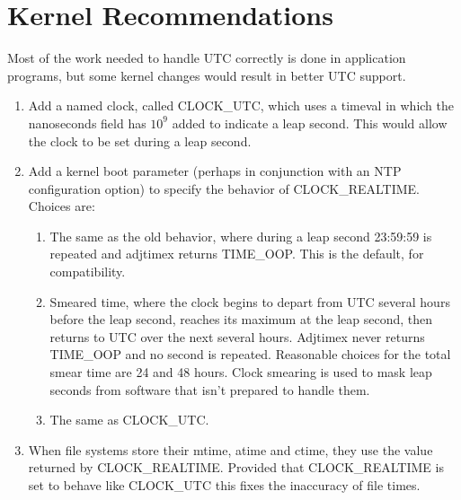 \documentclass[letterpaper,twoside]{article}
\begin{document}
\section{Kernel Recommendations}
\label{section:KernelRecommendations}
Most of the work needed to handle UTC correctly is done in application
programs, but some kernel changes would result in better UTC support.
\begin{enumerate}
\item Add a named clock, called {\ttfamily CLOCK\_UTC}, which uses
  a {\ttfamily timeval} in which the nanoseconds field has $10^{9}$ added to
  indicate a leap second.  This would allow the clock to be set
  during a leap second.
\item Add a kernel boot parameter (perhaps in conjunction with
  an NTP configuration option) to specify the behavior of
  {\ttfamily CLOCK\_REALTIME}.
  Choices are:
  \begin{enumerate}
  \item The same as the old behavior, where during a leap second
    23:59:59 is repeated and {\ttfamily adjtimex} returns
    {\ttfamily TIME\_OOP}.  This is the default, for compatibility.
  \item Smeared time, where the clock begins to depart from UTC several hours
    before the leap second, reaches its maximum at the leap second, then
    returns to UTC over the next several hours.  {\ttfamily Adjtimex}
    never returns {\ttfamily TIME\_OOP} and no second is repeated.
    Reasonable choices for the total smear time are 24 and 48 hours.
    Clock smearing is used to mask leap seconds from software that isn't
    prepared to handle them.
  \item The same as {\ttfamily CLOCK\_UTC}.
  \end{enumerate}
\item When file systems store their mtime, atime and ctime, they use
  the value returned by {\ttfamily CLOCK\_REALTIME}.  Provided that
  {\ttfamily CLOCK\_REALTIME} is set to behave like {\ttfamily CLOCK\_UTC}
  this fixes the inaccuracy of file times.
\end{enumerate}
\end{document}
